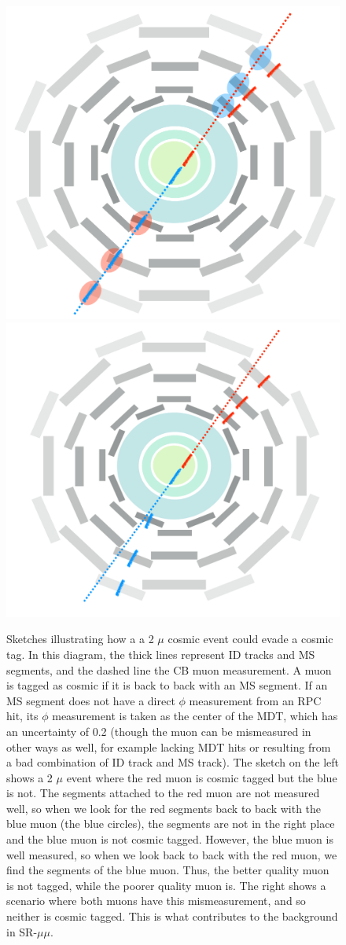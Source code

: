 \begin{figure}[!ht]
\centering
\includegraphics[width=.4\textwidth]{figures/cosmics/1badcos.png}
\includegraphics[width=.45\textwidth]{figures/cosmics/2badcos.png}
\caption{Sketches illustrating how a a 2 $\mu$ cosmic event could evade a cosmic tag. In this diagram, the thick lines represent ID tracks and MS segments, and the dashed line the CB muon measurement. A muon is tagged as cosmic if it is back to back with an MS segment. If an MS segment does not have a direct $\phi$ measurement from an RPC hit, its $\phi$ measurement is taken as the center of the MDT, which has an uncertainty of 0.2 (though the muon can be mismeasured in other ways as well, for example lacking MDT hits or resulting from a bad combination of ID track and MS track). The sketch on the left shows a 2 $\mu$ event where the red muon is cosmic tagged but the blue is not. The segments attached to the red muon are not measured well, so when we look for the red segments back to back with the blue muon (the blue circles), the segments are not in the right place and the blue muon is not cosmic tagged. However, the blue muon is well measured, so when we look back to back with the red  muon, we find the segments of the blue muon. Thus, the better quality muon is not tagged, while the poorer quality muon is. The right shows a scenario where both muons have this mismeasurement, and so neither is cosmic tagged. This is what contributes to the background in SR-$\mu\mu$.}
\label{fig:cosmic_mismeasure}
\end{figure}


